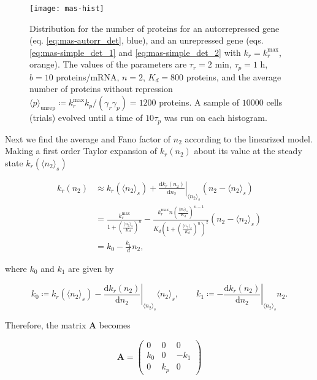 \begin{figure}[H]
  \centering
  \texttt{[image: mas-hist]}
  \caption[Histograms for protein number for a constitutive gene and a negatively autorregulated gene]{\label{fig:mas-sim_hist}Distribution for the number of proteins for an autorrepressed gene (eq. \ref{eq:mas-autorr_det}, blue), and an unrepressed gene (eqs. \ref{eq:mas-simple_det_1} and \ref{eq:mas-simple_det_2} with $k_r = k_r^\text{max}$, orange). The  values of the parameters are $\tau_r=2$ min, $\tau_p=1$ h, $b=10$ proteins/mRNA, $n=2$, $K_d=800$ proteins, and the average number of proteins without repression $\langle p\rangle_\text{unrep} \coloneqq k_r^\text{max}k_p/(\gamma_r\gamma_p) = 1200$ proteins. A sample of $10000$ cells (trials) evolved until a time of $10\tau_p$ was run on each histogram.}
\end{figure}

Next we find the average and Fano factor of $n_2$ according to the linearized model. Making a first order Taylor expansion of $k_r(n_2)$ about its value at the steady state $k_r(\langle n_2\rangle_s)$

\begin{equation}
  \begin{split}
  k_r(n_2) &\approx k_r(\langle n_2\rangle_s) + \left.\frac{\mathrm{d}k_r(n_2)}{\mathrm{d}n_2}\right|_{\langle n_2\rangle_s}\left(n_2-\langle n_2\rangle_s\right)\\
  &=\frac{k_r^{\text{max}}}{1+\left(\frac{\langle n_2\rangle_s}{K_d}\right)^n} - \frac{k_r^{\text{max}}n\left(\frac{\langle n_2\rangle_s}{K_d}\right)^{n-1}}{K_d\left(1+\left(\frac{\langle n_2\rangle_s}{K_d}\right)^n\right)^2}\left(n_2-\langle n_2\rangle_s\right)\\
  &= k_0-\frac{k_1}{d}n_2,
  \end{split}
\end{equation} 

where $k_0$ and $k_1$ are given by

\begin{equation*}
  k_0\coloneqq k_r(\langle n_2\rangle_s) - \left.\frac{\mathrm{d}k_r(n_2)}{\mathrm{d}n_2}\right|_{\langle n_2\rangle_s}\langle n_2\rangle_s,\quad\quad k_1 \coloneqq -\left.\frac{\mathrm{d}k_r(n_2)}{\mathrm{d}n_2}\right|_{\langle n_2\rangle_s}n_2. 
\end{equation*}

Therefore, the matrix $\mathbf{A}$ becomes

\begin{equation*}
  \mathbf{A} =
  \begin{pmatrix}
    0 & 0 & 0 \\
    k_0 & 0 & -k_1 \\
    0 & k_p & 0
  \end{pmatrix}
\end{equation*}

